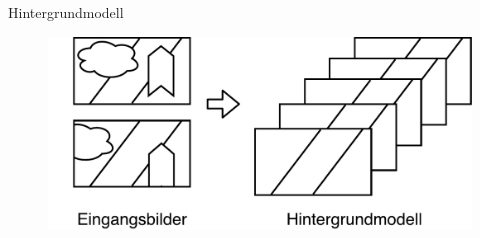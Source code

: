 \documentclass[hyperref={pdfpagelabels=false}]{beamer}
\begin{document}
\begin{frame}[t]{Hintergrundmodell}
	\bigskip
	\bigskip
	\begin{figure}
		\centering
		\includegraphics[width=0.95\linewidth]{Abbildungen/modell.pdf}
		\label{fig:Abbildungen/Grid}
	\end{figure}
\end{frame}
\end{document}
